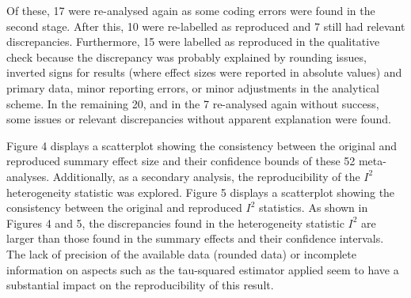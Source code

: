 \documentclass[
  ,apa7,floatsintext]{apa6}
\begin{document}
Of these, 17 were re-analysed again as some coding errors were found in the second stage. After this, 10 were re-labelled as reproduced and 7 still had relevant discrepancies. Furthermore, 15 were labelled as reproduced in the qualitative check because the discrepancy was probably explained by rounding issues, inverted signs for results (where effect sizes were reported in absolute values) and primary data, minor reporting errors, or minor adjustments in the analytical scheme. In the remaining 20, and in the 7 re-analysed again without success, some issues or relevant discrepancies without apparent explanation were found.

Figure 4 displays a scatterplot showing the consistency between the original and reproduced summary effect size and their confidence bounds of these 52 meta-analyses.
Additionally, as a secondary analysis, the reproducibility of the \(I^2\) heterogeneity statistic was explored. Figure 5 displays a scatterplot showing the consistency between the original and reproduced \(I^2\) statistics. As shown in Figures 4 and 5, the discrepancies found in the heterogeneity statistic \(I^2\) are larger than those found in the summary effects and their confidence intervals. The lack of precision of the available data (rounded data) or incomplete information on aspects such as the tau-squared estimator applied seem to have a substantial impact on the reproducibility of this result.
\end{document}

